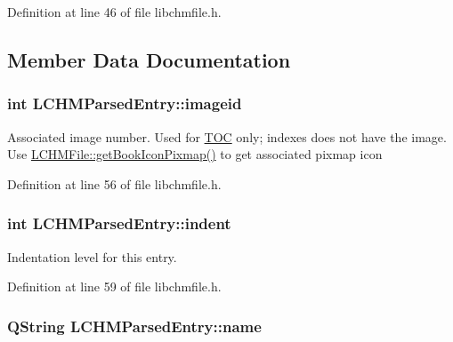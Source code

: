 Definition at line 46 of file libchmfile.\+h.



\subsection{Member Data Documentation}
\hypertarget{structLCHMParsedEntry_aefeb9372238ddebc327350e1696ec901}{
\subsubsection[{imageid}]{\setlength{\rightskip}{0pt plus 5cm}int L\+C\+H\+M\+Parsed\+Entry\+::imageid}}\label{structLCHMParsedEntry_aefeb9372238ddebc327350e1696ec901}
Associated image number. Used for \hyperlink{classTOC}{T\+O\+C} only; indexes does not have the image. Use \hyperlink{classLCHMFile_a42b6781e6c3227656c9b6d12922fb522}{L\+C\+H\+M\+File\+::get\+Book\+Icon\+Pixmap()} to get associated pixmap icon 

Definition at line 56 of file libchmfile.\+h.

\hypertarget{structLCHMParsedEntry_a33a145dba3dd4761f26b361dcf49017b}{
\subsubsection[{indent}]{\setlength{\rightskip}{0pt plus 5cm}int L\+C\+H\+M\+Parsed\+Entry\+::indent}}\label{structLCHMParsedEntry_a33a145dba3dd4761f26b361dcf49017b}


Indentation level for this entry. 



Definition at line 59 of file libchmfile.\+h.

\hypertarget{structLCHMParsedEntry_a90196da32bb2ed757f516caf583a6437}{
\subsubsection[{name}]{\setlength{\rightskip}{0pt plus 5cm}Q\+String L\+C\+H\+M\+Parsed\+Entry\+::name}}\label{structLCHMParsedEntry_a90196da32bb2ed757f516caf583a6437}


